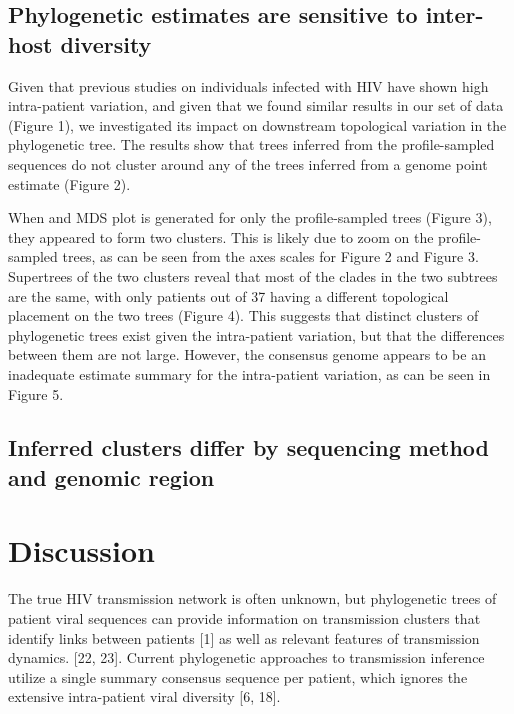 \documentclass[letterpaper]{article}
\begin{document}
\subsection*{Phylogenetic estimates are sensitive to inter-host diversity}

Given that previous studies on individuals infected with HIV have shown high intra-patient variation, and given that we found similar results in our set of data (Figure 1), we investigated its impact on downstream topological variation in the phylogenetic tree.  The results show that trees inferred from the profile-sampled sequences do not cluster around any of the trees inferred from a genome point estimate (Figure 2).

When and MDS plot is generated for only the profile-sampled trees (Figure 3), they appeared to form two clusters. This is likely due to zoom on the profile-sampled trees, as can be seen from the axes scales for Figure 2 and Figure 3. Supertrees of the two clusters reveal that most of the clades in the two subtrees are the same, with only patients out of 37 having a different topological placement on the two trees (Figure 4). This suggests that distinct clusters of phylogenetic trees exist given the intra-patient variation, but that the differences between them are not large.  However, the consensus genome appears to be an inadequate estimate summary for the intra-patient variation, as can be seen in Figure 5.

\subsection*{Inferred clusters differ by sequencing method and genomic region}


\section*{Discussion}

The true HIV transmission network is often unknown, but phylogenetic trees of patient viral sequences can provide information on transmission clusters that identify links between patients [1] as well as relevant features of transmission dynamics. [22, 23]. Current phylogenetic approaches to transmission inference utilize a single summary consensus sequence per patient, which ignores the extensive intra-patient viral diversity [6, 18].

\printbibliography
\end{document}
